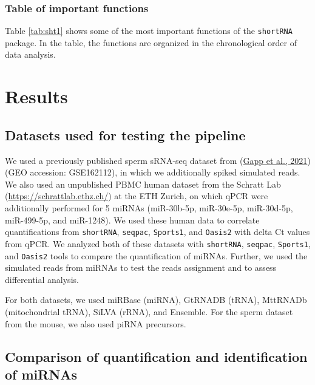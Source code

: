 \documentclass[12pt,twoside]{reedthesis}
\begin{document}
\hypertarget{table-of-important-functions}{%
\subsubsection{Table of important functions}\label{table-of-important-functions}}

Table \ref{tab:sht1} shows some of the most important functions of the \texttt{shortRNA}
package. In the table, the functions are organized in the chronological
order of data analysis.

\hypertarget{results}{%
\section{Results}\label{results}}

\hypertarget{datasets-used-for-testing-the-pipeline}{%
\subsection{Datasets used for testing the pipeline}\label{datasets-used-for-testing-the-pipeline}}

We used a previously published sperm sRNA-seq dataset from (\protect\hyperlink{ref-gapp2021}{Gapp et al., 2021})
(GEO accession: GSE162112), in which we additionally spiked simulated
reads. We also used an unpublished PBMC human dataset from the Schratt
Lab (\url{https://schrattlab.ethz.ch/}) at the ETH Zurich, on which qPCR
were additionally performed for 5 miRNAs (miR-30b-5p, miR-30e-5p,
miR-30d-5p, miR-499-5p, and miR-1248). We used these human data to
correlate quantifications from \texttt{shortRNA}, \texttt{seqpac}, \texttt{Sports1}, and \texttt{Oasis2}
with delta Ct values from qPCR. We analyzed both of these datasets with
\texttt{shortRNA}, \texttt{seqpac}, \texttt{Sports1}, and \texttt{Oasis2} tools to compare the
quantification of miRNAs. Further, we used the simulated reads from
miRNAs to test the reads assignment and to assess differential analysis.

For both datasets, we used miRBase (miRNA), GtRNADB (tRNA), MttRNADb
(mitochondrial tRNA), SiLVA (rRNA), and Ensemble. For the sperm dataset
from the mouse, we also used piRNA precursors.

\hypertarget{comparison-of-quantification-and-identification-of-mirnas}{%
\subsection{Comparison of quantification and identification of miRNAs}\label{comparison-of-quantification-and-identification-of-mirnas}}
\end{document}
